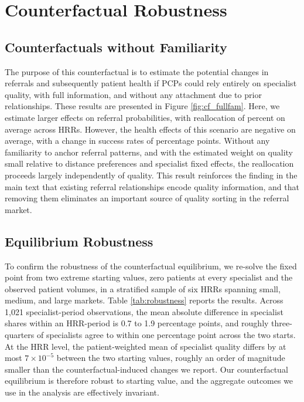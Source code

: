 \documentclass[12pt]{article}
\begin{document}

\section{Counterfactual Robustness}
\label{app:cf-robustness}

\subsection{Counterfactuals without Familiarity}
\label{app:cf-fullfam}

The purpose of this counterfactual is to estimate the potential changes in referrals and subsequently patient health if PCPs could rely entirely on specialist quality, with full information, and without any attachment due to prior relationships. These results are presented in Figure \ref{fig:cf_fullfam}. Here, we estimate larger effects on referral probabilities, with reallocation of \reallocationMeanFullFamMyopic{} percent on average across HRRs. However, the health effects of this scenario are negative on average, with a change in success rates of \healthFXMeanFullFamMyopic{} percentage points. Without any familiarity to anchor referral patterns, and with the estimated weight on quality small relative to distance preferences and specialist fixed effects, the reallocation proceeds largely independently of quality. This result reinforces the finding in the main text that existing referral relationships encode quality information, and that removing them eliminates an important source of quality sorting in the referral market.

\subsection{Equilibrium Robustness}
\label{app:robustness}

To confirm the robustness of the counterfactual equilibrium, we re-solve the fixed point from two extreme starting values, zero patients at every specialist and the observed patient volumes, in a stratified sample of six HRRs spanning small, medium, and large markets. Table \ref{tab:robustness} reports the results. Across 1,021 specialist-period observations, the mean absolute difference in specialist shares within an HRR-period is 0.7 to 1.9 percentage points, and roughly three-quarters of specialists agree to within one percentage point across the two starts. At the HRR level, the patient-weighted mean of specialist quality differs by at most $7 \times 10^{-5}$ between the two starting values, roughly an order of magnitude smaller than the counterfactual-induced changes we report. Our counterfactual equilibrium is therefore robust to starting value, and the aggregate outcomes we use in the analysis are effectively invariant.
\end{document}
